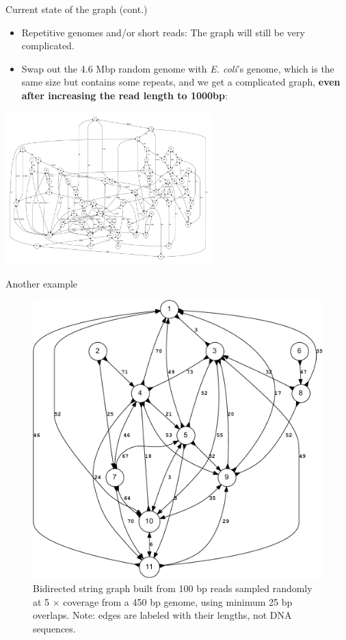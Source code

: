 \documentclass[xcolor=dvipsnames]{beamer}
\begin{document}
\begin{frame}{Current state of the graph (cont.)}
	\begin{itemize}
		\item Repetitive genomes and/or short reads: The graph will still be
		very complicated.
		\item Swap out the 4.6 Mbp random genome with {\it E. coli}'s genome,
		which is the same size but contains some repeats, and we get a
		complicated graph, {\bf even after increasing the read length to
		1000bp}:
	\end{itemize}
	\begin{center}
		\includegraphics[width=0.6\textwidth]{E_coli.pdf}
	\end{center}
\end{frame}


\begin{frame}{Another example}
	\begin{figure}[H]
		\includegraphics[scale=0.25]{example.bidigraph-crop.pdf}	
		\caption{Bidirected string graph built from 100 bp reads sampled
		randomly at 5 $\times$ coverage from a 450 bp genome, using minimum 25
		bp overlaps.  Note: edges are labeled with their lengths, not DNA
		sequences.}
	\end{figure}
\end{frame}
\end{document}

